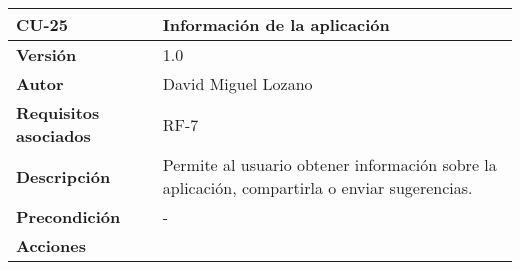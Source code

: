\begin{longtable}[H]{@{}ll@{}}
\toprule
\begin{minipage}[b]{0.26\columnwidth}\raggedright\strut
\textbf{CU-25}\strut
\end{minipage} & \begin{minipage}[b]{0.68\columnwidth}\raggedright\strut
\textbf{Información de la aplicación}\strut
\end{minipage}\tabularnewline
\midrule
\endhead
\begin{minipage}[t]{0.26\columnwidth}\raggedright\strut
\textbf{Versión}\strut
\end{minipage} & \begin{minipage}[t]{0.68\columnwidth}\raggedright\strut
1.0\strut
\end{minipage}\tabularnewline
\begin{minipage}[t]{0.26\columnwidth}\raggedright\strut
\textbf{Autor}\strut
\end{minipage} & \begin{minipage}[t]{0.68\columnwidth}\raggedright\strut
David Miguel Lozano\strut
\end{minipage}\tabularnewline
\begin{minipage}[t]{0.26\columnwidth}\raggedright\strut
\textbf{Requisitos asociados}\strut
\end{minipage} & \begin{minipage}[t]{0.68\columnwidth}\raggedright\strut
RF-7\strut
\end{minipage}\tabularnewline
\begin{minipage}[t]{0.26\columnwidth}\raggedright\strut
\textbf{Descripción}\strut
\end{minipage} & \begin{minipage}[t]{0.68\columnwidth}\raggedright\strut
Permite al usuario obtener información sobre la aplicación, compartirla
o enviar sugerencias.\strut
\end{minipage}\tabularnewline
\begin{minipage}[t]{0.26\columnwidth}\raggedright\strut
\textbf{Precondición}\strut
\end{minipage} & \begin{minipage}[t]{0.68\columnwidth}\raggedright\strut
-\strut
\end{minipage}\tabularnewline
\begin{minipage}[t]{0.26\columnwidth}\raggedright\strut
\textbf{Acciones}\strut
\end{minipage} & \begin{minipage}[t]{0.68\columnwidth}\raggedright\strut

\end{minipage}
\end{longtable}
